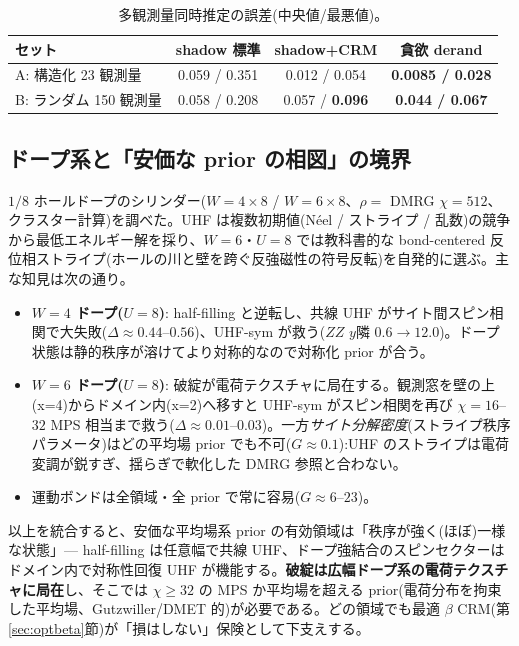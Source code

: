 \documentclass[11pt,a4paper]{ltjsarticle}
\begin{document}
\begin{table}[t]
\centering\small
\caption{多観測量同時推定の誤差(中央値/最悪値)。}
\label{tab:derand}
\begin{tabular}{@{}lccc@{}}
\toprule
セット & shadow 標準 & shadow+CRM & 貪欲 derand \\
\midrule
A: 構造化 23 観測量 & 0.059 / 0.351 & 0.012 / 0.054 & \textbf{0.0085 / 0.028} \\
B: ランダム 150 観測量 & 0.058 / 0.208 & 0.057 / \textbf{0.096} & \textbf{0.044 / 0.067} \\
\bottomrule
\end{tabular}
\end{table}

\subsection{ドープ系と「安価な prior の相図」の境界}
\label{sec:doped}
$1/8$ ホールドープのシリンダー($W=4\times8$ / $W=6\times8$、$\rho=$ DMRG $\chi=512$、クラスター計算)を調べた。UHF は複数初期値(Néel / ストライプ / 乱数)の競争から最低エネルギー解を採り、$W=6$・$U=8$ では教科書的な bond-centered 反位相ストライプ(ホールの川と壁を跨ぐ反強磁性の符号反転)を自発的に選ぶ。主な知見は次の通り。
\begin{itemize}
  \item \textbf{$W=4$ ドープ($U=8$)}: half-filling と逆転し、共線 UHF がサイト間スピン相関で大失敗($\Delta\approx0.44$--$0.56$)、UHF-sym が救う($ZZ$ $y$隣 $0.6\to12.0$)。ドープ状態は静的秩序が溶けてより対称的なので対称化 prior が合う。
  \item \textbf{$W=6$ ドープ($U=8$)}: 破綻が電荷テクスチャに局在する。観測窓を壁の上(x=4)からドメイン内(x=2)へ移すと UHF-sym がスピン相関を再び $\chi=16$--$32$ MPS 相当まで救う($\Delta\approx0.01$--$0.03$)。一方\emph{サイト分解密度}(ストライプ秩序パラメータ)はどの平均場 prior でも不可($G\approx0.1$):UHF のストライプは電荷変調が鋭すぎ、揺らぎで軟化した DMRG 参照と合わない。
  \item 運動ボンドは全領域・全 prior で常に容易($G\approx6$--$23$)。
\end{itemize}
以上を統合すると、安価な平均場系 prior の有効領域は「秩序が強く(ほぼ)一様な状態」— half-filling は任意幅で共線 UHF、ドープ強結合のスピンセクターはドメイン内で対称性回復 UHF が機能する。\textbf{破綻は広幅ドープ系の電荷テクスチャに局在}し、そこでは $\chi\ge32$ の MPS か平均場を超える prior(電荷分布を拘束した平均場、Gutzwiller/DMET 的)が必要である。どの領域でも最適 $\beta$ CRM(第\ref{sec:optbeta}節)が「損はしない」保険として下支えする。
\end{document}
